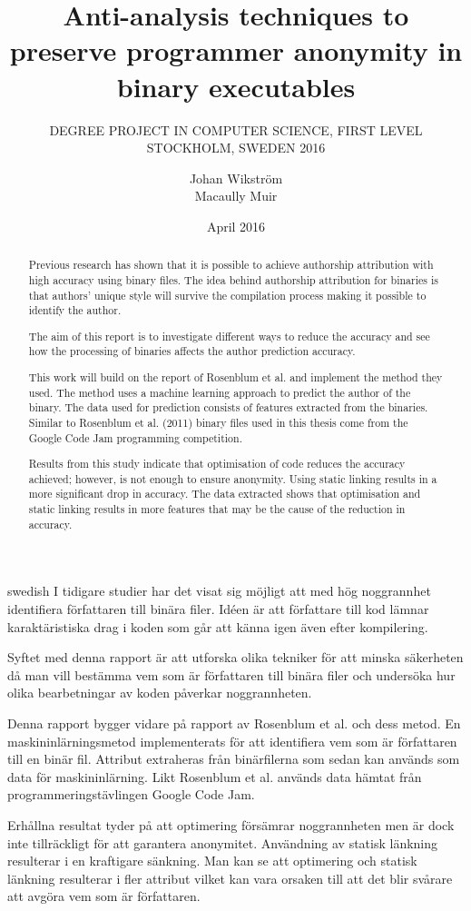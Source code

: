 \documentclass[a4paper,11pt]{kth-mag}
\title{Anti-analysis techniques to preserve programmer anonymity in binary
executables}
\subtitle{
    DEGREE PROJECT IN COMPUTER SCIENCE, FIRST LEVEL \\
    STOCKHOLM, SWEDEN 2016
}
\author{Johan Wikström \\ Macaully Muir}
\date{April 2016}
\begin{document}
\frontmatter
\pagestyle{empty}
\removepagenumbers
\maketitle
{}
\begin{abstract}
Previous research has shown that it is possible to achieve authorship
attribution with high accuracy using binary files. The idea behind authorship
attribution for binaries is that authors’ unique style will survive the
compilation process making it possible to identify the author.    

The aim of this report is to investigate different ways to reduce the accuracy
and see how the processing of binaries affects the author prediction accuracy.

This work will build on the report of Rosenblum et al. and implement the method
they used. The method uses  a machine learning approach to predict the author
of the binary. The data used for prediction consists of features extracted from
the binaries. Similar to Rosenblum et al. (2011) binary files used in this
thesis come from the Google Code Jam programming competition.

Results from this study indicate that optimisation of code reduces the accuracy
achieved; however, is not enough to ensure anonymity. Using static linking
results in a more significant drop in accuracy. The data extracted shows that
optimisation and static linking results in more features that may be the cause
of the reduction in accuracy.
\end{abstract}
\clearpage
\begin{foreignabstract}{swedish}
I tidigare studier har det visat sig möjligt att med hög noggrannhet
identifiera författaren till binära filer. Idéen är att författare till kod
lämnar karaktäristiska drag i koden som går att känna igen även efter
kompilering. 

Syftet med denna rapport är att utforska olika tekniker för att minska
säkerheten då man vill bestämma vem som är författaren till binära filer och
undersöka hur olika bearbetningar av koden påverkar noggrannheten.     

Denna rapport bygger vidare på rapport av Rosenblum et al. och dess metod. En
maskininlärningsmetod implementerats för att identifiera vem som är författaren
till en binär fil. Attribut extraheras från binärfilerna som sedan kan används
som data för maskininlärning. Likt Rosenblum et al. används data hämtat från
programmeringstävlingen Google Code Jam. 

Erhållna resultat tyder på att optimering försämrar noggrannheten men är dock
inte tillräckligt för att garantera anonymitet. Användning av statisk länkning
resulterar i en kraftigare sänkning. Man kan se att optimering och statisk
länkning resulterar i fler attribut vilket kan vara orsaken till att det blir
svårare att avgöra vem som är författaren.
\end{foreignabstract}
\clearpage
\tableofcontents*
\mainmatter
\pagestyle{newchap}
\end{document}
